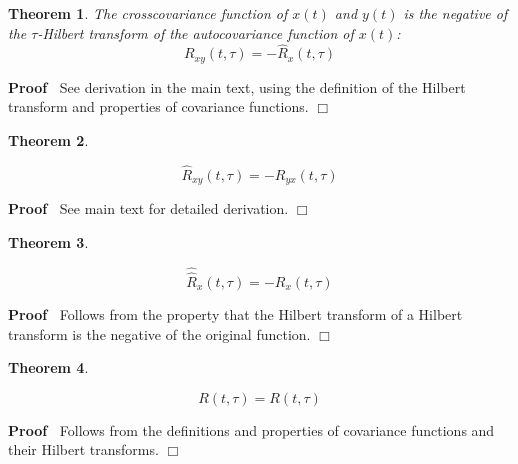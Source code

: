 \documentclass{article}
\newcommand{\tmdummy}{$\mbox{}$}
\newenvironment{proof}{\noindent\textbf{Proof\ }}{\hspace*{\fill}$\Box$\medskip}
\newtheorem{theorem}{Theorem}
\begin{document}
\begin{theorem}
  \label{thm:crosscov_hilbert}The crosscovariance function of $x (t)$ and $y
  (t)$ is the negative of the $\tau$-Hilbert transform of the autocovariance
  function of $x (t)$:
  \begin{equation}
    R_{xy} (t, \tau) = - \hat{R}_x (t, \tau) \label{eq:crosscov_hilbert}
  \end{equation}
\end{theorem}

\begin{proof}
  See derivation in the main text, using the definition of the Hilbert
  transform and properties of covariance functions.
\end{proof}

\begin{theorem}
  \label{thm:hilbert_cross}{\tmdummy}
  
  \begin{equation}
    \hat{R}_{xy} (t, \tau) = - R_{yx} (t, \tau) \label{eq:hilbert_cross}
  \end{equation}
\end{theorem}

\begin{proof}
  See main text for detailed derivation.
\end{proof}

\begin{theorem}
  \label{thm:hilbert_of_hilbert}{\tmdummy}
  
  \begin{equation}
    \widehat{\hat{R}}_x (t, \tau) = - R_x (t, \tau)
    \label{eq:hilbert_of_hilbert}
  \end{equation}
\end{theorem}

\begin{proof}
  Follows from the property that the Hilbert transform of a Hilbert transform
  is the negative of the original function.
\end{proof}

\begin{theorem}
  \label{thm:covariance_identity}{\tmdummy}
  
  \begin{equation}
    R (t, \tau) = R (t, \tau) \label{eq:covariance_identity}
  \end{equation}
\end{theorem}

\begin{proof}
  Follows from the definitions and properties of covariance functions and
  their Hilbert transforms.
\end{proof}
\end{document}
